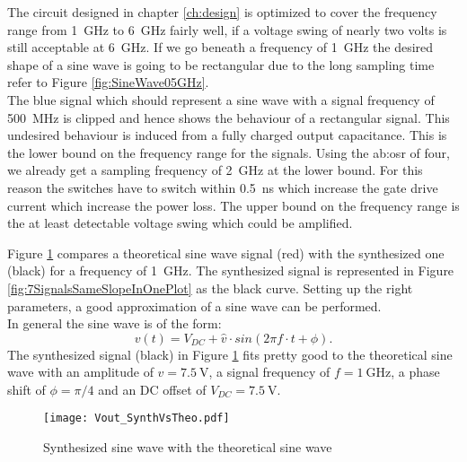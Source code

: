 The circuit designed in chapter \ref{ch:design} is optimized to cover the frequency range from \SI{1}{\GHz} to \SI{6}{\GHz} fairly well, if a voltage swing of nearly  two volts is still acceptable at \SI{6}{\GHz}.
If we go beneath a frequency of \SI{1}{\GHz} the desired shape of a sine wave is going to be rectangular due to the long sampling time refer to Figure \ref{fig:SineWave05GHz}.\\
The blue signal which should represent a sine wave with a signal frequency of \SI{500}{\MHz} is clipped and hence shows the behaviour of a rectangular signal.
 This undesired behaviour is induced from a fully charged output capacitance.
This is the lower bound on the frequency range for the signals.
Using the \gls{ab:osr} of four, we already get a sampling frequency of \SI{2}{GHz} at the lower bound.
For this reason the switches have to switch within \SI{0.5}{\nano \second} which increase the gate drive current which increase the power loss.
The upper bound on the frequency range is the at least detectable voltage swing which could be amplified.



Figure \ref{fig:SineWaveSynthVsTheoretical} compares a theoretical sine wave signal (red) with the synthesized one (black) for a frequency of \SI{1}{\GHz}.
The synthesized signal is represented in Figure \ref{fig:7SignalsSameSlopeInOnePlot} as the black curve.
Setting up the right parameters, a good approximation of a sine wave can be performed.\\
In general the sine wave is of the form: 
\begin{equation}
	v(t)= V_{DC} + \widehat{v} \cdot sin( 2  \pi  f \cdot  t + \phi).
\end{equation}
The synthesized signal (black) in Figure \ref{fig:SineWaveSynthVsTheoretical} fits pretty good to the theoretical sine wave with an amplitude of $\widehat{v} = \SI{7.5}{\volt}$, a signal frequency of $f = \SI{1}{\giga \hertz}$, a phase shift of $\phi = \pi / 4$ and an DC offset of $V_{DC} = \SI{7.5}{\volt}$.

\begin{figure}[htb!]
   \centering
   \texttt{[image: Vout\_SynthVsTheo.pdf]}
   \caption{Synthesized sine wave with the theoretical sine wave}
   \label{fig:SineWaveSynthVsTheoretical}
\end{figure}

